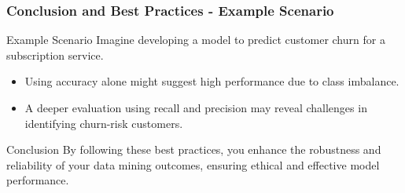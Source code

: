 \documentclass{beamer}
\begin{document}
\begin{frame}[fragile]
    \frametitle{Conclusion and Best Practices - Example Scenario}
    
    \begin{block}{Example Scenario}
        Imagine developing a model to predict customer churn for a subscription service. 
        \begin{itemize}
            \item Using accuracy alone might suggest high performance due to class imbalance.
            \item A deeper evaluation using recall and precision may reveal challenges in identifying churn-risk customers.
        \end{itemize}
    \end{block}

    \begin{block}{Conclusion}
        By following these best practices, you enhance the robustness and reliability of your data mining outcomes, ensuring ethical and effective model performance.
    \end{block}
\end{frame}
\end{document}
